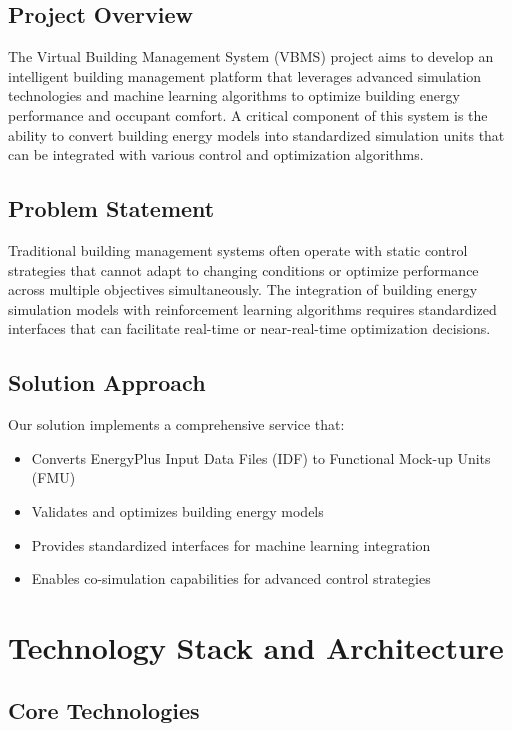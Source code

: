 \documentclass[12pt,a4paper]{article}
\begin{document}
\subsection{Project Overview}

The Virtual Building Management System (VBMS) project aims to develop an intelligent building management platform that leverages advanced simulation technologies and machine learning algorithms to optimize building energy performance and occupant comfort. A critical component of this system is the ability to convert building energy models into standardized simulation units that can be integrated with various control and optimization algorithms.

\subsection{Problem Statement}

Traditional building management systems often operate with static control strategies that cannot adapt to changing conditions or optimize performance across multiple objectives simultaneously. The integration of building energy simulation models with reinforcement learning algorithms requires standardized interfaces that can facilitate real-time or near-real-time optimization decisions.

\subsection{Solution Approach}

Our solution implements a comprehensive service that:
\begin{itemize}
    \item Converts EnergyPlus Input Data Files (IDF) to Functional Mock-up Units (FMU)
    \item Validates and optimizes building energy models
    \item Provides standardized interfaces for machine learning integration
    \item Enables co-simulation capabilities for advanced control strategies
\end{itemize}

\section{Technology Stack and Architecture}

\subsection{Core Technologies}
\end{document}
